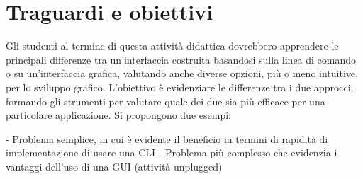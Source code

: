 \section{Traguardi e obiettivi}
Gli studenti al termine di questa attività didattica dovrebbero apprendere le principali differenze tra un'interfaccia costruita basandosi sulla linea di comando o su un'interfaccia grafica, valutando anche diverse opzioni, più o meno intuitive, per lo sviluppo grafico. L'obiettivo è evidenziare le differenze tra i due approcci, formando gli strumenti per valutare quale dei due sia più efficace per una particolare applicazione. 
Si propongono due esempi:
\begin{itemize}
- Problema semplice, in cui è evidente il beneficio in termini di rapidità di implementazione di usare una CLI
- Problema più complesso che evidenzia i vantaggi dell'uso di una GUI (attività unplugged)
\end{itemize}